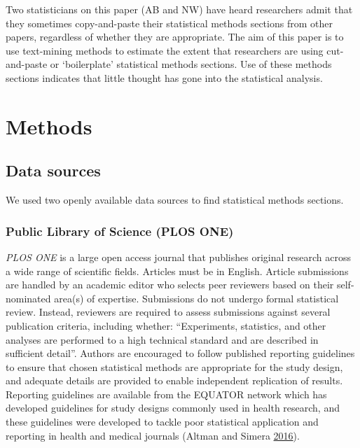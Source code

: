 \documentclass[
]{article}
\begin{document}
Two statisticians on this paper (AB and NW) have heard researchers admit
that they sometimes copy-and-paste their statistical methods sections
from other papers, regardless of whether they are appropriate. The aim
of this paper is to use text-mining methods to estimate the extent that
researchers are using cut-and-paste or `boilerplate' statistical methods
sections. Use of these methods sections indicates that little thought
has gone into the statistical analysis.

\hypertarget{methods}{%
\section{Methods}\label{methods}}

\hypertarget{data-sources}{%
\subsection{Data sources}\label{data-sources}}

We used two openly available data sources to find statistical methods
sections.

\hypertarget{public-library-of-science-plos-one}{%
\subsubsection{Public Library of Science (PLOS
ONE)}\label{public-library-of-science-plos-one}}

\emph{PLOS ONE} is a large open access journal that publishes original
research across a wide range of scientific fields. Articles must be in
English. Article submissions are handled by an academic editor who
selects peer reviewers based on their self-nominated area(s) of
expertise. Submissions do not undergo formal statistical review.
Instead, reviewers are required to assess submissions against several
publication criteria, including whether: ``Experiments, statistics, and
other analyses are performed to a high technical standard and are
described in sufficient detail''. Authors are encouraged to follow
published reporting guidelines to ensure that chosen statistical methods
are appropriate for the study design, and adequate details are provided
to enable independent replication of results. Reporting guidelines are
available from the EQUATOR network which has developed guidelines for
study designs commonly used in health research, and these guidelines
were developed to tackle poor statistical application and reporting in
health and medical journals (Altman and Simera
\protect\hyperlink{ref-Altman2016}{2016}).
\end{document}
